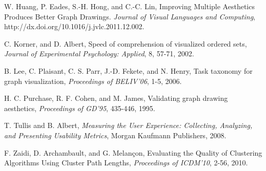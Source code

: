 \documentclass[conference,letterpaper]{IEEEtran}
\begin{document}
\begin{thebibliography}{99}
W. Huang, P. Eades, S.-H. Hong, and C.-C. Lin, Improving Multiple Aesthetics Produces Better Graph Drawings. \emph{Journal of Visual Languages and Computing}, http://dx.doi.org/10.1016/j.jvlc.2011.12.002.

C. Korner, and D. Albert, Speed of comprehension of visualized ordered sets, \emph{Journal of Experimental Psychology: Applied}, 8, 57-71, 2002.

B. Lee, C. Plaisant, C. S. Parr, J.-D. Fekete, and N. Henry, Task taxonomy for graph visualization, \emph{Proceedings of BELIV'06}, 1-5, 2006.


H. C. Purchase, R. F. Cohen, and M. James, Validating graph drawing aesthetics, \emph{Proceedings of GD'95}, 435-446, 1995.


T. Tullis and B. Albert, \emph{Measuring the User Experience: Collecting, Analyzing, and Presenting Usability Metrics}, Morgan Kaufmann Publishers, 2008.

F. Zaidi, D. Archambault, and G. Melançon, Evaluating the Quality of Clustering Algorithms Using Cluster Path Lengths, \emph{Proceedings of ICDM'10}, 2-56, 2010. 


\end{thebibliography} 
\end{document}
